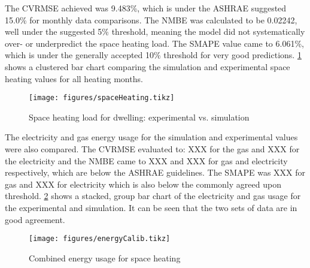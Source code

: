 The \ac{CVRMSE} achieved was 9.483\%, which is under the ASHRAE suggested 15.0\% for monthly data comparisons. The \ac{NMBE} was calculated to be 0.02242, well under the suggested 5\%  threshold, meaning the model did not systematically over- or underpredict the space heating load. The \ac{SMAPE} value came to 6.061\%, which is under the generally accepted 10\% threshold for very good predictions. \cref{fig:spaceheatingcalib} shows a clustered bar chart comparing the simulation and experimental space heating values for all heating months. 

\begin{figure}[htb]
    \centering
    \texttt{[image: figures/spaceHeating.tikz]}
    \caption{Space heating load for dwelling: experimental vs. simulation}
    \label{fig:spaceheatingcalib}
\end{figure}


The electricity and gas energy usage for the simulation and experimental values were also compared. The \ac{CVRMSE} evaluated to: XXX for the gas and XXX for the electricity and the \ac{NMBE} came to XXX and XXX for gas and electricity respectively, which are below the ASHRAE guidelines. The \ac{SMAPE} was XXX for gas and XXX for electricity which is also below the commonly agreed upon threshold. \cref{fig:energycalib} shows a stacked, group bar chart of the electricity and gas usage for the experimental and simulation. It can be seen that the two sets of data are in good agreement.


\begin{figure}[htb]
    \centering
    \texttt{[image: figures/energyCalib.tikz]}
    \caption{Combined energy usage for space heating}
    \label{fig:energycalib}
\end{figure}



